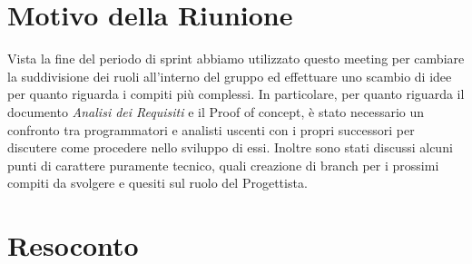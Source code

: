 \section{Motivo della Riunione}
Vista la fine del periodo di sprint abbiamo utilizzato questo meeting per cambiare la suddivisione dei ruoli all'interno del gruppo ed effettuare uno scambio di idee per quanto riguarda i compiti più complessi.
\newline In particolare, per quanto riguarda il documento \textit{Analisi dei Requisiti} e il Proof of concept, è stato necessario un confronto tra programmatori e analisti uscenti con i propri successori per discutere come procedere nello sviluppo di essi.
\newline Inoltre sono stati discussi alcuni punti di carattere puramente tecnico, quali creazione di branch per i prossimi compiti da svolgere e quesiti sul ruolo del Progettista.
\section{Resoconto}

